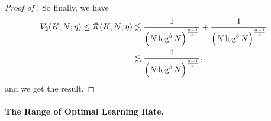 \begin{proof}[Proof of ]
So finally, we have
\begin{align*}
    V_2(K,N;\eta) \le \bar{\mathcal{R}}(K,N;\eta)
    &\lesssim \frac{1}{\left(N\log^b N\right)^{\frac{a-1}{a}}}+\frac{1}{\left(N\log^b N\right)^{\frac{a-1}{a}}}\\
    &\lesssim \frac{1}{\left(N\log^b N\right)^{\frac{a-1}{a}}},
\end{align*}
and we get the result.
\end{proof}
\paragraph{The Range of Optimal Learning Rate.}


